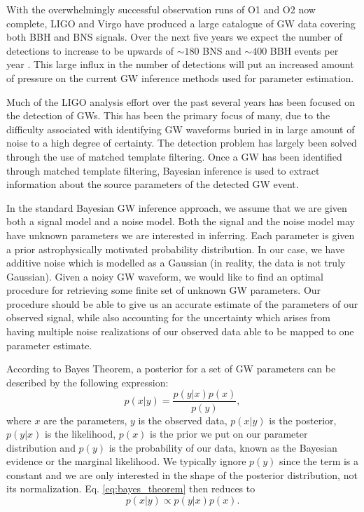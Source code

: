 \documentclass[%
showpacs,
 amsmath,amssymb,
 aps,
 twocolumn,
 prl,
 reprint,
floatfix,
]{revtex4-1}
\begin{document}
%
%
With the overwhelmingly successful observation runs of O1 and O2 
now complete, \ac{LIGO} and Virgo have produced a large 
catalogue of \ac{GW} data covering both \ac{BBH} and \ac{BNS} signals\cite{1811.12907}. Over the next five years 
we expect the number of detections to increase to be upwards 
of $\sim180$ \ac{BNS} and $\sim400$ BBH events per year \cite{1304.0670,1811.12907}. This large influx in the number 
of detections will put an increased amount of pressure on the current \ac{GW} inference 
methods used for parameter estimation.  

%
%
Much of the \ac{LIGO} analysis effort over the past several years has been focused 
on the detection of \ac{GW}s. This has been the primary 
focus of many, due to the difficulty associated 
with identifying \ac{GW} waveforms buried in 
in large amount of noise to a high degree of certainty. The detection problem has largely 
been solved through the use of matched template filtering\cite{0264-9381-33-21-215004}. 
Once a \ac{GW} has been identified through matched template filtering, Bayesian inference 
is used to extract information about the source 
parameters of the detected \ac{GW} event.

%
%
In the standard Bayesian \ac{GW} inference approach, we assume that we are
given both a signal model and a noise model. Both the signal and the 
noise model may have unknown parameters we are interested in inferring. 
Each parameter is given a prior astrophysically motivated probability 
distribution. In our case, we have additive noise which is modelled as 
a Gaussian (in reality, the data is not truly Gaussian). Given a noisy
\ac{GW} waveform, we would like to find an optimal procedure for retrieving
some finite set of unknown GW parameters. Our procedure should be able
to give us an accurate estimate of the parameters of our observed signal, while
also accounting for the uncertainty which arises from having multiple noise
realizations of our observed data able to be mapped to one parameter
estimate.

%
%
According to Bayes Theorem, a posterior for a set of GW parameters can be described by the
following expression:
%
\begin{equation}
    p(x|y) = \frac{p(y|x) p(x)}{p(y)},\label{eq:bayes_theorem}
\end{equation}
%
where $x$ are the parameters, $y$ is the
observed data, $p(x|y)$ is the posterior, $p(y|x)$ is the likelihood, $p(x)$ is
the prior we put on our parameter distribution and $p(y)$ is the probability of
our data, known as the Bayesian evidence or the marginal likelihood. We
typically ignore $p(y)$ since the term is a constant and we are only interested
in the shape of the posterior distribution, not its normalization. Eq.
\ref{eq:bayes_theorem} then reduces to
%
\begin{equation}\label{eq:simplified_bayes} 
p(x|y) \propto p(y|x) p(x).
\end{equation} 
   
\end{document}
